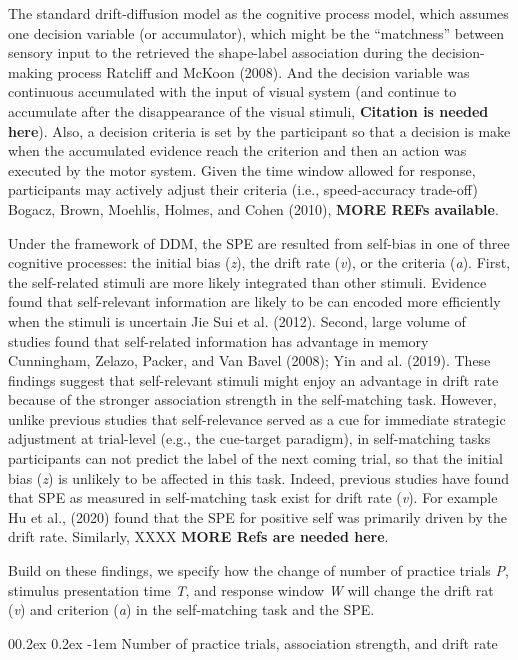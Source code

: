 \documentclass[
  english,
  man,floatsintext]{apa6}
\makeatletter
\let\oldparagraph\paragraph
\renewcommand{\paragraph}{
    \@ifstar
      \xxxParagraphStar
      \xxxParagraphNoStar
  }
\newcommand{\xxxParagraphStar}[1]{\oldparagraph*{#1}\mbox{}}
\newcommand{\xxxParagraphNoStar}[1]{\oldparagraph{#1}\mbox{}}
\renewcommand{\paragraph}{\@startsection{paragraph}{4}{\parindent}%
  {0\baselineskip \@plus 0.2ex \@minus 0.2ex}%
  {-1em}%
  {\normalfont\normalsize\bfseries\itshape\typesectitle}}
\makeatother
\begin{document}
The standard drift-diffusion model as the cognitive process model, which assumes one decision variable (or accumulator), which might be the ``matchness'' between sensory input to the retrieved the shape-label association during the decision-making process Ratcliff and McKoon (2008). And the decision variable was continuous accumulated with the input of visual system (and continue to accumulate after the disappearance of the visual stimuli, \textbf{Citation is needed here}). Also, a decision criteria is set by the participant so that a decision is make when the accumulated evidence reach the criterion and then an action was executed by the motor system. Given the time window allowed for response, participants may actively adjust their criteria (i.e., speed-accuracy trade-off) Bogacz, Brown, Moehlis, Holmes, and Cohen (2010), \textbf{MORE REFs available}.

Under the framework of DDM, the SPE are resulted from self-bias in one of three cognitive processes: the initial bias (\emph{z}), the drift rate (\emph{v}), or the criteria (\emph{a}). First, the self-related stimuli are more likely integrated than other stimuli. Evidence found that self-relevant information are likely to be can encoded more efficiently when the stimuli is uncertain Jie Sui et al. (2012). Second, large volume of studies found that self-related information has advantage in memory Cunningham, Zelazo, Packer, and Van Bavel (2008); Yin and al. (2019). These findings suggest that self-relevant stimuli might enjoy an advantage in drift rate because of the stronger association strength in the self-matching task. However, unlike previous studies that self-relevance served as a cue for immediate strategic adjustment at trial-level (e.g., the cue-target paradigm), in self-matching tasks participants can not predict the label of the next coming trial, so that the initial bias (\emph{z}) is unlikely to be affected in this task. Indeed, previous studies have found that SPE as measured in self-matching task exist for drift rate (\emph{v}). For example Hu et al., (2020) found that the SPE for positive self was primarily driven by the drift rate. Similarly, XXXX \textbf{MORE Refs are needed here}.

Build on these findings, we specify how the change of number of practice trials \emph{P}, stimulus presentation time \emph{T}, and response window \emph{W} will change the drift rat (\emph{v}) and criterion (\emph{a}) in the self-matching task and the SPE.

\paragraph{Number of practice trials, association strength, and drift rate}\label{number-of-practice-trials-association-strength-and-drift-rate}
\end{document}
